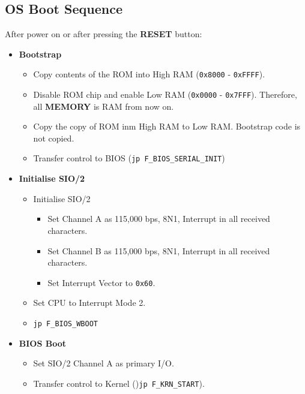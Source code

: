 \documentclass[a4paper,11pt]{article}
\begin{document}
    \subsection{OS Boot Sequence}
    After power on or after pressing the \textbf{RESET} button:

    \begin{itemize}
        \item \textbf{Bootstrap}
        \begin{itemize}
            \item Copy contents of the ROM into High RAM (\texttt{0x8000} - \texttt{0xFFFF}).
            \item Disable ROM chip and enable Low RAM (\texttt{0x0000} - \texttt{0x7FFF}).
            Therefore, all \textbf{MEMORY} is RAM from now on.
            \item Copy the copy of ROM inm High RAM to Low RAM. Bootstrap code is not copied.
            \item Transfer control to BIOS (\texttt{jp F\_BIOS\_SERIAL\_INIT})
        \end{itemize}
        \item \textbf{Initialise SIO/2}
        \begin{itemize}
            \item Initialise SIO/2
            \begin{itemize}
                \item Set Channel A as 115,000 bps, 8N1, Interrupt in all 
                received characters.
                \item Set Channel B as 115,000 bps, 8N1, Interrupt in all 
                received characters.
                \item Set Interrupt Vector to \texttt{0x60}.
            \end{itemize}
            \item Set CPU to Interrupt Mode 2.
            \item \texttt{jp F\_BIOS\_WBOOT}
        \end{itemize}
        \item \textbf{BIOS Boot}
        \begin{itemize}
            \item Set SIO/2 Channel A as primary I/O.
            \item Transfer control to Kernel ()\texttt{jp F\_KRN\_START}).

\end{itemize}
\end{itemize}
\end{document}
